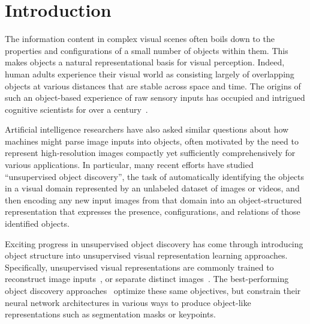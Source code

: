 \documentclass{article}
\newcommand{\jd}[1]{\textcolor{orange}{[DJ: #1]}}
\begin{document}
\section{Introduction}
\label{sec:intro}





The information content in complex visual scenes often boils down to the properties and configurations of a small number of objects within them. This makes objects a natural representational basis for visual perception. Indeed, human adults experience their visual world as consisting largely of overlapping objects at various distances that are stable across space and time. The origins of such an object-based experience of raw sensory inputs has occupied and intrigued cognitive scientists for over a century~\cite{wertheimer1912experimentelle, wertheimer1938laws, spelke1990principles, spelke1992origins, johnson2010infants, spelke2007core}.%

Artificial intelligence researchers have also asked similar questions about how machines might parse image inputs into objects, often motivated by the need to represent high-resolution images compactly yet sufficiently comprehensively for various applications. In particular, many recent efforts have studied ``unsupervised object discovery'', the task of automatically identifying the objects in a visual domain represented by an unlabeled dataset of images or videos, and then encoding any new input images from that domain into an object-structured representation that expresses the presence, configurations, and relations of those identified objects. 


Exciting progress in unsupervised object discovery has come through introducing object structure into unsupervised visual representation learning approaches. Specifically, unsupervised visual representations are commonly trained to reconstruct image inputs~\cite{oord2017neural, dippel2021towards}, or separate distinct images~\cite{chen2020improved,chen2020simple}. The best-performing object discovery approaches~\cite{eslami2016attend,jakab2018unsupervised,jakab2020self,greff2019multi, burgess2019monet,crawford2019spatially,locatello2020object,racah2020slot, lowe2020learning, Kulkarni2019UnsupervisedLO, minderer2019unsupervised, engelcke2019genesis, lin2020space} optimize these same objectives, but constrain their neural network architectures in various ways to produce object-like representations such as segmentation masks or keypoints.  %
\end{document}
